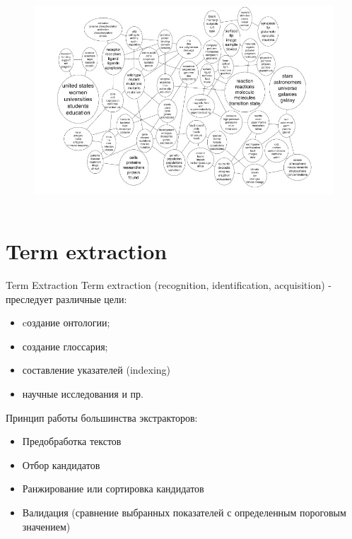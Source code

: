 \documentclass{beamer}
\begin{document}
\begin{frame}
\begin{figure}
\includegraphics[height=8cm]{topmod5.jpg}
\end{figure}
\end{frame}


\section{Term extraction}
\begin{frame}{Term Extraction}
Term extraction (recognition, identification, acquisition) - преследует различные цели:
\begin{itemize}
\item cоздание онтологии;
\item создание глоссария;
\item составление указателей (indexing)
\item научные исследования и пр.
\end{itemize}


\end{frame}

\begin{frame}{Принцип работы большинства экстракторов:}
\begin{itemize}
\item Предобработка текстов
\item Отбор кандидатов
\item Ранжирование или сортировка кандидатов
\item Валидация (сравнение выбранных показателей с определенным пороговым значением)
\end{itemize}

\end{frame}
\end{document}
